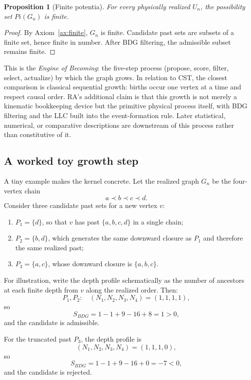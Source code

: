 \documentclass[11pt]{article}
\def\Pi{Pi}%
\def\mathrm#1{#1}%
\newtheorem{proposition}{Proposition}
\newcommand{\Pot}{\ensuremath{\Pi}}
\begin{document}
\begin{proposition}[Finite potentia]
For every physically realized $U_n$, the possibility set $\Pot(G_n)$ is finite.
\end{proposition}
\begin{proof}
By Axiom~\ref{ax:finite}, $G_n$ is finite. Candidate past sets are subsets of a finite set, hence finite in number. After BDG filtering, the admissible subset remains finite.
\end{proof}

This is the \emph{Engine of Becoming}: the five-step process (propose, score, filter, select, actualize) by which the graph grows. In relation to CST, the closest comparison is classical sequential growth: births occur one vertex at a time and respect causal order. RA's additional claim is that this growth is not merely a kinematic bookkeeping device but the primitive physical process itself, with BDG filtering and the LLC built into the event-formation rule. Later statistical, numerical, or comparative descriptions are downstream of this process rather than constitutive of it.

\subsection{A worked toy growth step}

A tiny example makes the kernel concrete. Let the realized graph $G_n$ be the four-vertex chain
\[
a \prec b \prec c \prec d.
\]
Consider three candidate past sets for a new vertex $v$:

\begin{enumerate}[label=(\alph*)]
\item $P_1=\{d\}$, so that $v$ has past $\{a,b,c,d\}$ in a single chain;
\item $P_2=\{b,d\}$, which generates the same downward closure as $P_1$ and therefore the same realized past;
\item $P_3=\{a,c\}$, whose downward closure is $\{a,b,c\}$.
\end{enumerate}

For illustration, write the depth profile schematically as the number of ancestors at each finite depth from $v$ along the realized order. Then:
\[
P_1,P_2:\quad (N_1,N_2,N_3,N_4)=(1,1,1,1),
\]
so
\[
S_{\mathrm{BDG}}=1-1+9-16+8=1>0,
\]
and the candidate is admissible.

For the truncated past $P_3$, the depth profile is
\[
(N_1,N_2,N_3,N_4)=(1,1,1,0),
\]
so
\[
S_{\mathrm{BDG}}=1-1+9-16+0=-7<0,
\]
and the candidate is rejected.
\end{document}
